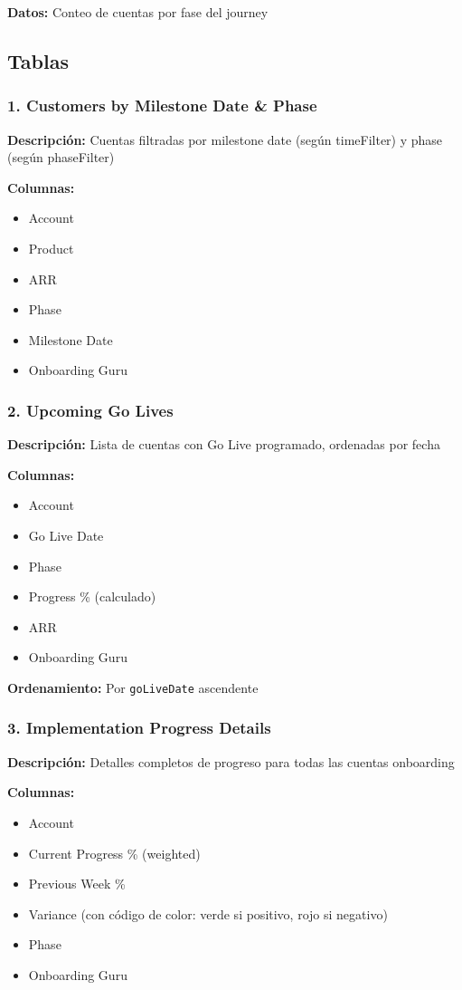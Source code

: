 \documentclass[12pt,a4paper]{article}
\begin{document}
\textbf{Datos:} Conteo de cuentas por fase del journey

\subsection{Tablas}

\subsubsection{1. Customers by Milestone Date \& Phase}
\textbf{Descripción:} Cuentas filtradas por milestone date (según timeFilter) y phase (según phaseFilter)

\textbf{Columnas:}
\begin{itemize}
    \item Account
    \item Product
    \item ARR
    \item Phase
    \item Milestone Date
    \item Onboarding Guru
\end{itemize}

\subsubsection{2. Upcoming Go Lives}
\textbf{Descripción:} Lista de cuentas con Go Live programado, ordenadas por fecha

\textbf{Columnas:}
\begin{itemize}
    \item Account
    \item Go Live Date
    \item Phase
    \item Progress \% (calculado)
    \item ARR
    \item Onboarding Guru
\end{itemize}

\textbf{Ordenamiento:} Por \texttt{goLiveDate} ascendente

\subsubsection{3. Implementation Progress Details}
\textbf{Descripción:} Detalles completos de progreso para todas las cuentas onboarding

\textbf{Columnas:}
\begin{itemize}
    \item Account
    \item Current Progress \% (weighted)
    \item Previous Week \%
    \item Variance (con código de color: verde si positivo, rojo si negativo)
    \item Phase
    \item Onboarding Guru
\end{itemize}
\end{document}

